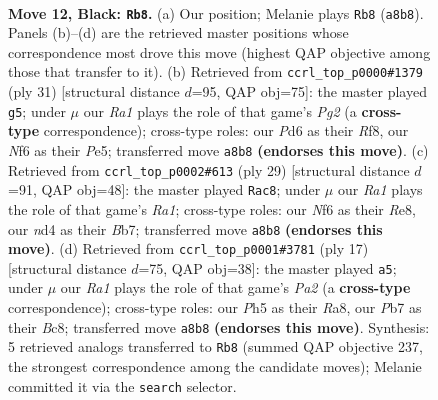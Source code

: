 \documentclass[11pt]{article}
\begin{document}
\begin{figure}[p]
\label{fig:thought-m21}
\end{figure}

\clearpage

\begin{figure}[p]\centering
\begin{subfigure}{0.46\textwidth}\centering
\resizebox{\linewidth}{!}{%
\newchessgame
\chessboard[
  setfen={r1b1qrk1/pp1n1pb1/2pp1np1/7p/PPPNPP1P/2N3P1/6B1/R1BQK2R b KQ - 0 12},
  showmover=false,
  pgfstyle=straightmove, color=movearrow, markmove={a8-b8}
]}
\caption{}
\end{subfigure}\hfill
\begin{subfigure}{0.46\textwidth}\centering
\resizebox{\linewidth}{!}{%
\newchessgame
\chessboard[
  setfen={1k1r1r2/pbp1n1pp/1pnq4/4p3/3PPp2/2PB1P2/P3NBPP/2RQ1R1K b - - 1 16},
  showmover=false,
  pgfstyle=straightmove, color=movearrow, markmove={g7-g5}
]}
\caption{}
\end{subfigure}
\\[4pt]
\begin{subfigure}{0.46\textwidth}\centering
\resizebox{\linewidth}{!}{%
\newchessgame
\chessboard[
  setfen={r3r1k1/1bqnbppp/pp1ppn2/8/1PPP1B2/P1N2N1P/2Q1BPP1/R1R3K1 b - - 2 15},
  showmover=false,
  pgfstyle=straightmove, color=movearrow, markmove={a8-c8}
]}
\caption{}
\end{subfigure}\hfill
\begin{subfigure}{0.46\textwidth}\centering
\resizebox{\linewidth}{!}{%
\newchessgame
\chessboard[
  setfen={r1bq1rk1/pp1n1pbp/2pp1np1/4p3/2PPP3/2N2NPP/PP3PB1/R1BQ1RK1 b - - 0 9},
  showmover=false,
  pgfstyle=straightmove, color=movearrow, markmove={a7-a5}
]}
\caption{}
\end{subfigure}
\caption{\textbf{Move 12, Black: \texttt{Rb8}.} (a) Our position; Melanie plays \texttt{Rb8} (\texttt{a8b8}). Panels (b)--(d) are the retrieved master positions whose correspondence most drove this move (highest QAP objective among those that transfer to it). (b) Retrieved from \texttt{ccrl\_top\_p0000\#1379} (ply 31) [structural distance $d$=95, QAP obj=75]: the master played \texttt{g5}; under $\mu$ our \emph{Ra1} plays the role of that game's \emph{Pg2} (a \textbf{cross-type} correspondence); cross-type roles: our \emph{P}d6 as their \emph{R}f8, our \emph{N}f6 as their \emph{P}e5; transferred move \texttt{a8b8} \textbf{(endorses this move)}. (c) Retrieved from \texttt{ccrl\_top\_p0002\#613} (ply 29) [structural distance $d$=91, QAP obj=48]: the master played \texttt{Rac8}; under $\mu$ our \emph{Ra1} plays the role of that game's \emph{Ra1}; cross-type roles: our \emph{N}f6 as their \emph{R}e8, our \emph{n}d4 as their \emph{B}b7; transferred move \texttt{a8b8} \textbf{(endorses this move)}. (d) Retrieved from \texttt{ccrl\_top\_p0001\#3781} (ply 17) [structural distance $d$=75, QAP obj=38]: the master played \texttt{a5}; under $\mu$ our \emph{Ra1} plays the role of that game's \emph{Pa2} (a \textbf{cross-type} correspondence); cross-type roles: our \emph{P}h5 as their \emph{R}a8, our \emph{P}b7 as their \emph{B}c8; transferred move \texttt{a8b8} \textbf{(endorses this move)}. Synthesis: 5 retrieved analogs transferred to \texttt{Rb8} (summed QAP objective 237, the strongest correspondence among the candidate moves); Melanie committed it via the \texttt{search} selector.}

\end{figure}
\end{document}
